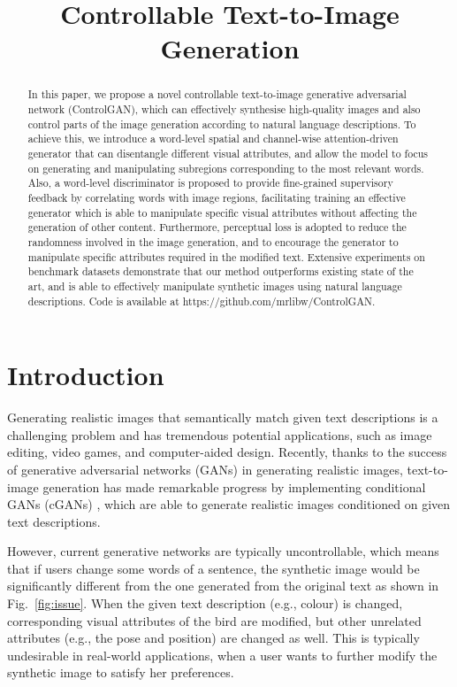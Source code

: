 \title{Controllable Text-to-Image Generation}

\begin{abstract}
In this paper, we propose a novel controllable text-to-image generative adversarial network (ControlGAN), which can effectively synthesise high-quality images and {also control parts of the image generation} according to natural language descriptions. To achieve this, we introduce a word-level spatial and channel-wise attention-driven generator that can disentangle different visual attributes, and allow the model to focus on generating and manipulating subregions corresponding to the most relevant words. Also, a word-level discriminator is proposed to provide fine-grained supervisory feedback by correlating words with image regions, facilitating training an effective generator which is able to manipulate specific visual attributes without affecting the generation of other content. Furthermore, perceptual loss is adopted to reduce the randomness involved in the image generation, and to encourage the generator to manipulate specific attributes required in the modified text. Extensive experiments on benchmark datasets demonstrate that our method outperforms existing state of the art, and is able to effectively manipulate synthetic images using natural language descriptions. Code is available at \textcolor{colour}{https://github.com/mrlibw/ControlGAN}.
\end{abstract}

\section{Introduction}
\label{intro}
Generating realistic images that semantically match given text descriptions is a challenging problem and has tremendous potential applications, such as image editing, video games, and computer-aided design. Recently, thanks to the success of generative adversarial networks (GANs) \cite{denton2015deep, goodfellow2014generative, radford2015unsupervised} in generating realistic images, text-to-image generation has made remarkable progress \cite{reed2016generative, xu2018attngan, zhang2017stackgan} by implementing conditional GANs (cGANs) \cite{dong2017semantic, reed2016generative, reed2016learning}, which are able to generate realistic images conditioned on given text descriptions.

However, current generative networks are typically uncontrollable, which means that if users change some words of a sentence, the synthetic image would be significantly different from the one generated from the original text as shown in Fig.~\ref{fig:issue}. When the given text description (e.g., colour) is changed, corresponding visual attributes of the bird are modified, but other unrelated attributes (e.g., the pose and position) are changed as well. This is typically undesirable in real-world applications, when a user wants to further modify the synthetic image to satisfy her preferences.

